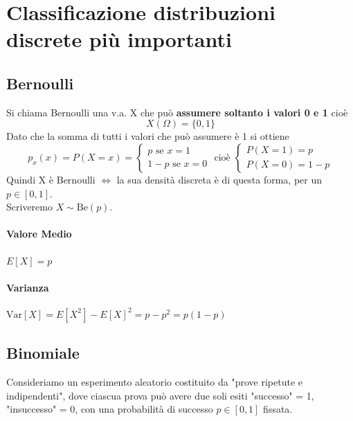 \documentclass[12pt, a4paper, openany]{book}
\begin{document}
\section{Classificazione distribuzioni discrete più importanti}
\subsection*{Bernoulli}
Si chiama Bernoulli una v.a. X che può \textbf{assumere soltanto i valori 0 e 1} cioè
\begin{equation*}
    X(\Omega) = \{0,1\}
\end{equation*}
Dato che la somma di tutti i valori che può assumere è 1 si ottiene
\begin{equation*}
    p_x (x) = P(X=x) = 
    \begin{cases}
    p \text{ se } x=1\\
    1-p \text{ se } x=0
    \end{cases} 
    \text{ cioè }
    \begin{cases}
        P(X=1) = p\\
        P(X=0)= 1-p
    \end{cases}
\end{equation*}
Quindi X è Bernoulli $\Leftrightarrow$ la sua densità discreta è di questa
forma, per un $p \in [0,1]$.
\\ Scriveremo $X \sim \text{Be}(p)$.
\paragraph*{Valore Medio} $E[X] = p$
\paragraph*{Varianza} $\text{Var}[X] = E[X^2] - E[X]^2 = p-p^2 = p(1-p)$

\subsection*{Binomiale}
Consideriamo un esperimento aleatorio costituito da "prove ripetute e indipendenti",
dove ciascua prova può avere due soli esiti "successo" = 1, "insuccesso" = 0, con una
probabilità di successo $p \in [0,1]$ fissata.
\end{document}
